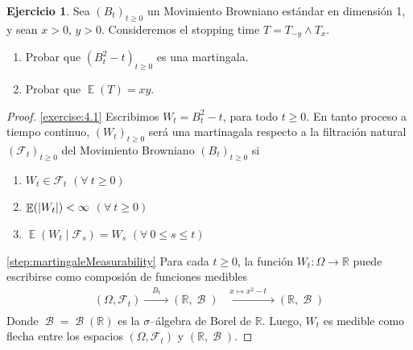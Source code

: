 \documentclass{article}
\DeclareMathOperator{\borel}{\mathscr{B}}
\DeclareMathOperator{\Expectation}{\mathbb{E}}
\newcommand{\realnum}{\mathbb{R}}
\newcommand{\brownian}{B}
\newcommand{\wiener}{W}
\newcommand{\events}{\mathcal{F}}
\theoremstyle{definition}
\newtheorem{exercise}{Ejercicio}
\begin{document}
\newpage
\begingroup
\newcommand{\wienerProcess}{(\wiener_t)_{t \geq 0}}
\begin{exercise}
Sea \((\brownian_t)_{t \geq 0}\) un Movimiento Browniano estándar en dimensión 1, y sean \(x > 0\), \(y > 0\).
Consideremos el stopping time \(T = T_{- y} \wedge T_x\).
\begin{enumerate}[ref=\theexercise.\labelenumi]
	\item 
	\label{exercise:4.1}
	Probar que \((\brownian_t^2 - t)_{t \geq 0}\) es una martingala.
	\item 
	\label{exercise:4.2}
	Probar que \(\Expectation(T) = xy\).
\end{enumerate}
\end{exercise}
\begin{proof} \ref{exercise:4.1}
Escribimos \(\wiener_t = \brownian_t^2 - t\), para todo \(t \geq 0\).
En tanto proceso a tiempo continuo, \((\wiener_t)_{t \geq 0}\) será una martinagala respecto a la filtración natural \((\events_t)_{t \geq 0}\) del Movimiento Browniano \((\brownian_t)_{t \geq 0}\) si
\begin{enumerate}[label=\roman*., ref=Paso \labelenumi]
	\item 
	\label{step:martingaleMeasurability}
	\(\wiener_t \in \events_t\) \((\forall\: t \geq 0)\)
	\item 
	\label{step:martingaleIntegrability}
	\(\Expectation(\abs{\wiener_t}) < \infty\) \((\forall\: t \geq 0)\)
	\item
	\label{step:martingaleProperty}
	\(\Expectation(\wiener_t \mid \events_s) = \wiener_s\) \((\forall\: 0 \leq s \leq t)\)
\end{enumerate}

\ref{step:martingaleMeasurability}
Para cada \(t \geq 0\), la función \(\wiener_t : \Omega \rightarrow \realnum\) puede escribirse como composión de funciones medibles
\begin{align}
	\left( \Omega, \events_t \right) 
	\xrightarrow[]{\displaystyle \quad \brownian_t \quad}
	\left( \realnum, \borel \right)
	\xrightarrow[]{\displaystyle \quad x \mapsto x^2 - t \quad}
	\left( \realnum, \borel \right)
\end{align}
Donde \(\borel = \borel(\realnum)\) es la \(\sigma\)--álgebra de Borel de \(\realnum\).
Luego, \(\wiener_t\) es medible como flecha entre los espacios \((\Omega, \events_t)\) y \((\realnum, \borel)\).


\end{proof}
\end{document}

